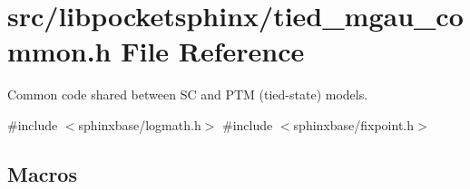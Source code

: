 \section{src/libpocketsphinx/tied\+\_\+mgau\+\_\+common.h File Reference}
\label{tied__mgau__common_8h}


Common code shared between SC and P\+TM (tied-\/state) models.  


{\ttfamily \#include $<$sphinxbase/logmath.\+h$>$}\newline
{\ttfamily \#include $<$sphinxbase/fixpoint.\+h$>$}\newline
\subsection*{Macros}
